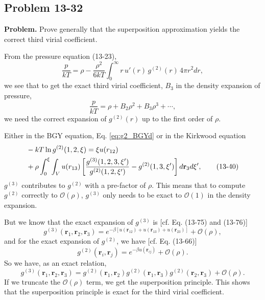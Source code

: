 \documentclass[twocolumn, 10pt]{article}
\numberwithin{equation}{section}
\newenvironment{problem}
{\par\medskip \color{problue}
  \textbf{Problem. }\ignorespaces}
{\medskip}
\newenvironment{solution}[1][\empty]
{\par\medskip\sffamily
  \textbf{\ifx\empty#1{Solution.}\relax\else{#1}\fi} \ignorespaces}
{\medskip}
\begin{document}
\subsection{Problem 13-32}

\begin{problem}
  Prove generally that the superposition approximation
  yields the correct third virial coefficient.
\end{problem}

\begin{solution}
  From the pressure equation (13-23),
  \begin{equation}
    \frac{p}{kT}
    =
    \rho - \frac{\rho^2}{6kT}
    \int_0^\infty r \, u'(r) \, g^{(2)}(r) \, 4 \pi r^2 dr
    ,
    \tag{13-23}
  \end{equation}
  we see that to get the exact third virial coefficient, $B_3$
  in the density expansion of pressure,
  $$
  \frac{p}{kT} = \rho + B_2 \rho^2 + B_3 \rho^3 + \cdots,
  $$
  we need the correct expansion of $g^{(2)}(r)$
  up to the first order of $\rho$.

  Either in the BGY equation, Eq. \eqref{eq:g2_BGYd}
  or in the Kirkwood equation
  \begin{align}
    &-kT \ln g^{(2)}(1, 2, \xi)
    =
    \xi u(r_{12})
    \notag \\
    &+
    \rho\int_0^\xi
    \int_V u(r_{13})
    \left[
      \frac{g^{(3)}(1, 2, 3, \xi')}{g^{(2)}(1,2,\xi')}
      -
      g^{(2)}(1, 3, \xi')
      \right] d\mathbf r_3 d\xi'
    ,
    \tag{13-40}
  \end{align}
  $g^{(3)}$ contributes to $g^{(2)}$
  with a pre-factor of $\rho$.
  This means that to compute $g^{(2)}$ correctly
  to $\mathcal O(\rho)$,
  $g^{(3)}$ only needs to be exact
  to $\mathcal O(1)$ in the density expansion.

  But we know that the exact expansion of $g^{(3)}$ is
  [cf. Eq. (13-75) and (13-76)]
  $$
  g^{(3)}(\mathbf r_1, \mathbf r_2, \mathbf r_3)
  =
  e^{-\beta [u(\mathbf r_{12}) + u(\mathbf r_{13}) + u(\mathbf r_{23})]}
  + \mathcal O(\rho)
  ,
  $$
  and for the exact expansion of $g^{(2)}$, we have
  [cf. Eq. (13-66)]
  $$
  g^{(2)}(\mathbf r_i, \mathbf r_j)
  =
  e^{-\beta u(\mathbf r_{ij})}
  + \mathcal O(\rho)
  .
  $$
  So we have, as an exact relation,
  $$
  g^{(3)}(\mathbf r_1, \mathbf r_2, \mathbf r_3)
  =
  g^{(2)}(\mathbf r_1, \mathbf r_2)
  g^{(2)}(\mathbf r_1, \mathbf r_3)
  g^{(2)}(\mathbf r_2, \mathbf r_3)
  + \mathcal O(\rho).
  $$
  If we truncate the $\mathcal O(\rho)$ term,
  we get the superposition principle.
  This shows that the superposition principle
  is exact for the third virial coefficient.
\end{solution}
\end{document}
